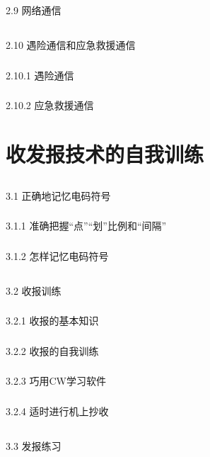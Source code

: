 \documentclass[12pt,UTF8]{ctexbook}
\begin{document}
\section{}2.9 网络通信
\section{}2.10 遇险通信和应急救援通信
\subsection{}2.10.1 遇险通信
\subsection{}2.10.2 应急救援通信

\chapter{收发报技术的自我训练}

\section{}3.1 正确地记忆电码符号
\subsection{}3.1.1 准确把握“点”“划”比例和“间隔”
\subsection{}3.1.2 怎样记忆电码符号
\section{}3.2 收报训练
\subsection{}3.2.1 收报的基本知识
\subsection{}3.2.2 收报的自我训练
\subsection{}3.2.3 巧用CW学习软件
\subsection{}3.2.4 适时进行机上抄收
\section{}3.3 发报练习
\end{document}
